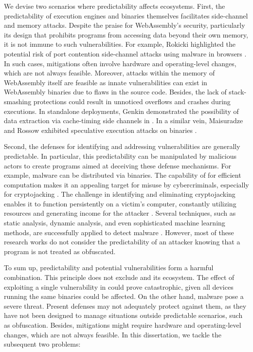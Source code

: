 We devise two scenarios where predictability affects \Wasm ecosystems.
First, the predictability of execution engines and \Wasm binaries themselves facilitates side-channel and memory attacks.
Despite the praise for WebAssembly's security, particularly its design that prohibits programs from accessing data beyond their own memory, it is not immune to such vulnerabilities. 
For example, Rokicki \etal highlighted the potential risk of port contention side-channel attacks using \Wasm malware in browsers \cite{10.1145/3488932.3517411}. 
In such cases, mitigations often involve hardware and operating-level changes, which are not always feasible.
Moreover, attacks within the memory of WebAssembly itself are feasible\cite{10296897, usenixWasm2020} as innate vulnerabilities can exist in WebAssembly binaries due to flaws in the source code. 
Besides, the lack of stack-smashing protections could result in unnoticed overflows and crashes during \Wasm executions\cite{DeRoover2022}. 
In standalone deployments, Genkin \etal demonstrated the possibility of data extraction via cache-timing side channels in \Wasm \cite{Genkin2018DrivebyKC}. 
In a similar vein, Maisuradze and Rossow exhibited speculative execution attacks on \Wasm binaries \cite{ret2spec}.


Second, the defenses for identifying and addressing vulnerabilities are generally predictable. 
In particular, this predictability can be manipulated by malicious actors to create programs aimed at deceiving these defense mechanisms. 
For example, malware can be distributed via \Wasm binaries. 
The capability of \Wasm for efficient computation makes it an appealing target for misuse by cybercriminals, especially for cryptojacking \cite{10.1145/3339252.3339261}. 
The challenge in identifying and eliminating cryptojacking enables it to function persistently on a victim's computer, constantly utilizing resources and generating income for the attacker \cite{9566204}.  
Several techniques, such as static analysis, dynamic analysis, and even sophisticated machine learning methods, are successfully applied to detect \Wasm malware \cite{Minesweeper, MinerRay, MINOS, SEISMIC, RAPID, Outguard}. 
However, most of these research works do not consider the predictability of an attacker knowing that a \Wasm program is not treated as obfuscated.






To sum up, predictability and potential vulnerabilities form a harmful combination. 
This principle does not exclude \Wasm and its ecosystem.
The effect of exploiting a single vulnerability in \Wasm could prove catastrophic, given all devices running the same \Wasm binaries could be affected. 
On the other hand, \Wasm malware pose a severe threat. 
Present defenses may not adequately protect against them, as they have not been designed to manage situations outside predictable scenarios, such as obfuscation. 
Besides, mitigations might require hardware and operating-level changes, which are not always feasible.
In this dissertation, we tackle the subsequent two problems:

